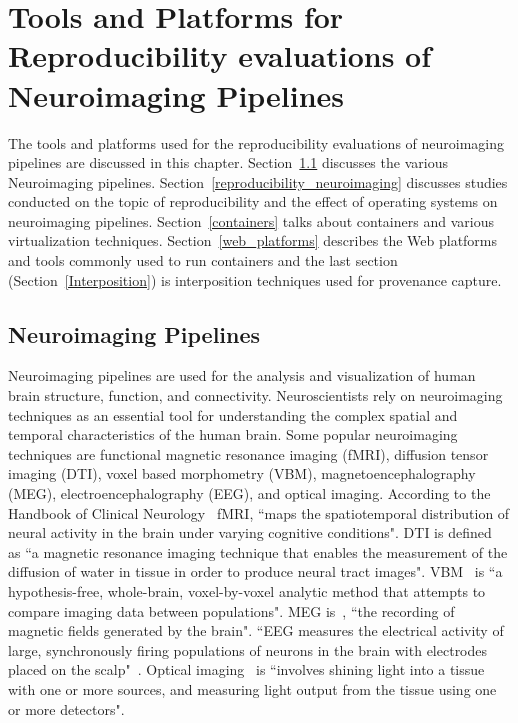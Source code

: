 \chapter{Tools and Platforms for Reproducibility evaluations of Neuroimaging Pipelines}\label{toolsandplatforms}

The tools and platforms used for the reproducibility evaluations of neuroimaging pipelines are discussed in this chapter.
Section~\ref{neuroimaging} discusses the various Neuroimaging pipelines. Section~\ref{reproducibility_neuroimaging} discusses studies conducted on the topic of reproducibility and the effect of operating systems on neuroimaging pipelines. Section~\ref{containers} talks about containers and various virtualization techniques. Section~\ref{web_platforms} describes the Web platforms and tools commonly used to run containers and the last section (Section~\ref{Interposition}) is interposition techniques used for provenance capture.

\section{Neuroimaging Pipelines}\label{neuroimaging}
Neuroimaging pipelines are used for the analysis and visualization of human brain structure, function, and connectivity. Neuroscientists rely on neuroimaging techniques as an essential tool for understanding the complex spatial and temporal characteristics of the human brain. Some popular neuroimaging techniques are functional magnetic resonance imaging (fMRI), diffusion tensor imaging (DTI), voxel based morphometry (VBM), magnetoencephalography (MEG), electroencephalography (EEG), and optical imaging. According  to the Handbook of Clinical Neurology~\cite{BUCHBINDER201661} fMRI, ``maps the spatiotemporal distribution of neural activity in the brain under varying cognitive conditions". DTI is defined~\cite{Rizea11} as ``a magnetic resonance imaging technique that enables the measurement of the diffusion of water in tissue in order to produce neural tract images". VBM~\cite{MELONAKOS201165} is ``a hypothesis-free, whole-brain, voxel-by-voxel analytic method that attempts to compare imaging data between populations". MEG is~\cite{Sato1985}, ``the recording of magnetic fields generated by the brain". ``EEG measures the electrical activity of large, synchronously firing populations of neurons in the brain with electrodes placed on the scalp"~\cite{Light2010}. Optical imaging~\cite{doi:10.1080/23273798.2017.1290810} is ``involves shining light into a tissue with one or more sources, and measuring light output from the tissue using one or more detectors".

